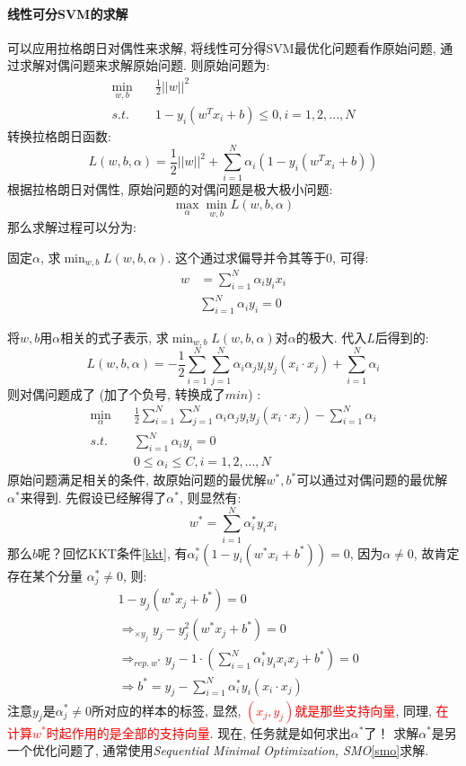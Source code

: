 \paragraph{线性可分SVM的求解}
可以应用拉格朗日对偶性来求解, 将线性可分得SVM最优化问题看作原始问题, 通过求解对偶问题来求解原始问题. 则原始问题为: 
\begin{align}
	\mathop{min}_{w, b}&\quad \frac{1}{2}||w||^2 \nonumber \\
	s.t.&\quad 1 - y_i(w^T x_i + b) \leq 0, i = 1, 2, ..., N \nonumber
\end{align}
转换拉格朗日函数: 
$$
L(w, b, \alpha) = \frac{1}{ 2}  ||w||^2 + \sum_{i=1}^{N} \alpha_i (1  - y_i(w^T x_i + b))
$$
根据拉格朗日对偶性, 原始问题的对偶问题是极大极小问题: 
$$
\mathop{max}_{\alpha} \mathop{min}_{w, b} L(w, b, \alpha)
$$
那么求解过程可以分为: 
\begin{myenumerate}
	\item 固定$\alpha$, 求$\mathop{min}_{w, b} L(w, b, \alpha)$. 这个通过求偏导并令其等于0, 可得: 
	\begin{align}
		w &= \sum_{i=1}^N \alpha_i y_i x_i	\nonumber \\
		&\sum_{i=1}^N \alpha_i y_i = 0 \nonumber
	\end{align}
	
	\item 将$w, b$用$\alpha$相关的式子表示, 求$\mathop{min}_{w, b} L(w, b, \alpha)$对$\alpha$的极大. 代入$L$后得到的: 
	$$
	L(w, b, \alpha) = -\frac{1}{2} \sum_{i=1}^N \sum_{j=1}^{N} \alpha_i \alpha_j y_i y_j (x_i \cdot x_j) + \sum_{i=1}^N \alpha_i
	$$	
	则对偶问题成了 (加了个负号, 转换成了$min$) : 
	\begin{align}
		\mathop{min}_{\alpha}\quad &\frac{1}{2} \sum_{i=1}^N \sum_{j=1}^{N} \alpha_i \alpha_j y_i y_j (x_i \cdot x_j) - \sum_{i=1}^N \alpha_i \nonumber \\
		s.t.\quad &\sum_{i=1}^N \alpha_i y_i = 0 \nonumber \\
				  &0 \leq \alpha_i \leq C, i = 1, 2, ..., N \nonumber
	\end{align}
	原始问题满足相关的条件, 故原始问题的最优解$w^*, b^*$可以通过对偶问题的最优解$\alpha^*$来得到. 先假设已经解得了$\alpha^*$, 则显然有: 
	$$
	w^* = \sum_{i=1}^N \alpha_i^* y_i x_i
	$$
	那么$b$呢？回忆KKT条件\ref{kkt}, 有$\alpha_i^* (1 - y_i(w^* x_i + b^*)) = 0$, 因为$\alpha \neq 0$, 故肯定存在某个分量 $\alpha_j^* \neq 0$, 则: 
	\begin{align}
		&1 - y_j(w^* x_j + b^*) = 0 \nonumber \\
		&\mathop{\Longrightarrow}_{\times y_j} y_j - y_j^2 (w^* x_j + b^*) = 0 \nonumber \\
		&\mathop{\Longrightarrow}_{rep.\  w^*} y_j - 1 \cdot (\sum_{i=1}^N \alpha_i^* y_i x_i x_j + b^*) = 0 \nonumber \\
		&\Longrightarrow b^* = y_j - \sum_{i=1}^N \alpha_i^* y_i (x_i \cdot x_j) \nonumber 
	\end{align}
	注意$y_j$是$\alpha_j^* \neq 0$所对应的样本的标签, 显然, \textcolor{red}{$(x_j, y_j)$就是那些支持向量}, 同理, \textcolor{red}{在计算$w^*$时起作用的是全部的支持向量}. 
	现在, 任务就是如何求出$\alpha^*$了！	求解$\alpha^*$是另一个优化问题了, 通常使用\textit{Sequential Minimal Optimization, SMO}\ref{smo}求解. 
\end{myenumerate}

